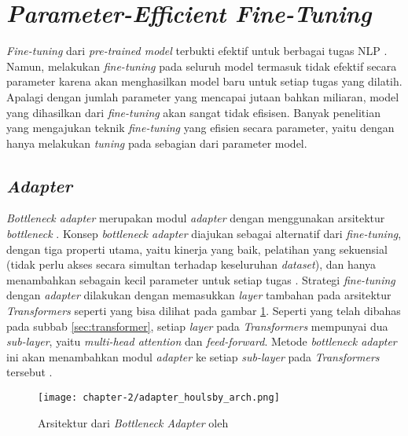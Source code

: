 \section{\textit{Parameter-Efficient Fine-Tuning}}
\label{sec:peft}

\textit{Fine-tuning} dari \textit{pre-trained model} terbukti efektif untuk berbagai tugas NLP \parencite{fine_tuning}. Namun, melakukan \textit{fine-tuning} pada seluruh model termasuk tidak efektif secara parameter karena akan menghasilkan model baru untuk setiap tugas yang dilatih. Apalagi dengan jumlah parameter yang mencapai jutaan bahkan miliaran, model yang dihasilkan dari \textit{fine-tuning} akan sangat tidak efisisen. Banyak penelitian yang mengajukan teknik \textit{fine-tuning} yang efisien secara parameter, yaitu \PEFT dengan hanya melakukan \textit{tuning} pada sebagian dari parameter model.

\subsection{\textit{Adapter}}

\textit{Bottleneck adapter} merupakan modul \textit{adapter} dengan menggunakan arsitektur \textit{bottleneck} \parencite{adapter_houlsby}. Konsep \textit{bottleneck adapter} diajukan sebagai alternatif dari \textit{fine-tuning}, dengan tiga properti utama, yaitu kinerja yang baik, pelatihan yang sekuensial (tidak perlu akses secara simultan terhadap keseluruhan \textit{dataset}), dan hanya menambahkan sebagain kecil parameter untuk setiap tugas \parencite{adapter_houlsby}. Strategi \textit{fine-tuning} dengan \textit{adapter} dilakukan dengan memasukkan \textit{layer} tambahan pada arsitektur \textit{Transformers} seperti yang bisa dilihat pada gambar \ref{fig:adapters_houlsby_arch}. Seperti yang telah dibahas pada subbab \ref{sec:transformer}, setiap \textit{layer} pada \textit{Transformers} mempunyai dua \textit{sub-layer}, yaitu \textit{multi-head attention} dan \textit{feed-forward}. Metode \textit{bottleneck adapter} ini akan menambahkan modul \textit{adapter} ke setiap \textit{sub-layer} pada \textit{Transformers} tersebut \parencite{adapter_houlsby}.

\begin{figure}[h]
    \vspace{0.25cm}
    \centering
    \texttt{[image: chapter-2/adapter\_houlsby\_arch.png]}
    \caption{Arsitektur dari \textit{Bottleneck Adapter} oleh \citeauthor{adapter_houlsby} \parencite{adapter_houlsby}}
    \label{fig:adapters_houlsby_arch}
\end{figure}

